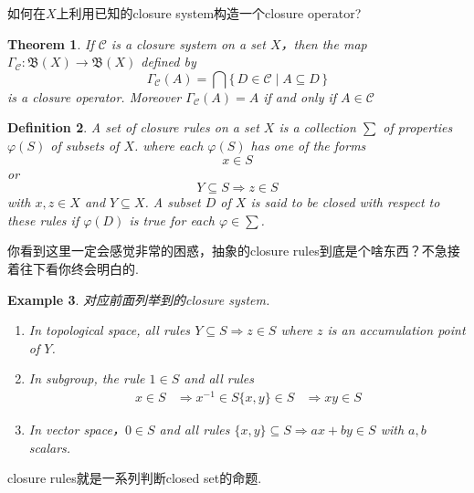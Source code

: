 \documentclass{article}
\newtheorem{theorem}{Theorem}[section]
\newtheorem{example}[theorem]{Example}
\newtheorem{definition}[theorem]{Definition}
\newcommand*{\xfunc}[4]{{#2}\colon{#3}{#1}{#4}}
\newcommand*{\func}[3]{\xfunc{\to}{#1}{#2}{#3}}
\newcommand\Set[2]{\{\,#1\mid#2\,\}} %
\begin{document}

{\color{red} 如何在$X$上利用已知的closure system构造一个closure operator}?

\begin{theorem}
\rm If $\mathcal{C}$ is a closure system on a set $X$，then the map $\func{\Gamma_{\mathcal{C}}}{\mathfrak{B}(X)}{\mathfrak{B}(X)}$ defined by 
$$
\Gamma_{\mathcal{C}}(A) = \bigcap \Set{D \in \mathcal{C}}{A \subseteq D}
$$
is a closure operator. Moreover $\Gamma_{\mathcal{C}}(A)=A$ if and only if $A \in \mathcal{C}$
\end{theorem}


\begin{definition}
\rm A set of {\color{red} closure rules} on a set $X$ is a collection $\sum$ of properties $\varphi(S)$ of subsets of $X$. where each $\varphi(S)$ has one of the forms
$$
x \in S
$$
or 
$$ 
Y \subseteq S \Rightarrow z \in S
$$ 
with $x,z \in X$ and $Y \subseteq X$. A subset $D$ of $X$ is said to be closed with respect to these rules if $\varphi(D)$ is true for each $\varphi \in \sum$.
\end{definition}

{\color{blue} 你看到这里一定会感觉非常的困惑，抽象的closure rules到底是个啥东西？不急接着往下看你终会明白的}.

\begin{example}
\rm 对应前面列举到的closure system.
\begin{enumerate}
	\item In topological space, all rules $Y \subseteq S \Rightarrow z \in S$ where $z$ is an accumulation point of $Y$.  
	\item In subgroup, the rule $1 \in S$ and all rules
	$$
		\begin{aligned}
			x \in S &\Rightarrow x^{-1} \in S
			\{x,y\} \in S &\Rightarrow xy \in S
		\end{aligned}
	$$
	\item In vector space，$0 \in S$ and all rules $\{x,y\} \subseteq S \Rightarrow ax + by \in S$ with $a,b$ scalars. 
\end{enumerate}
\end{example}

{\color{blue} closure rules就是一系列判断closed set的命题}.
\end{document}

